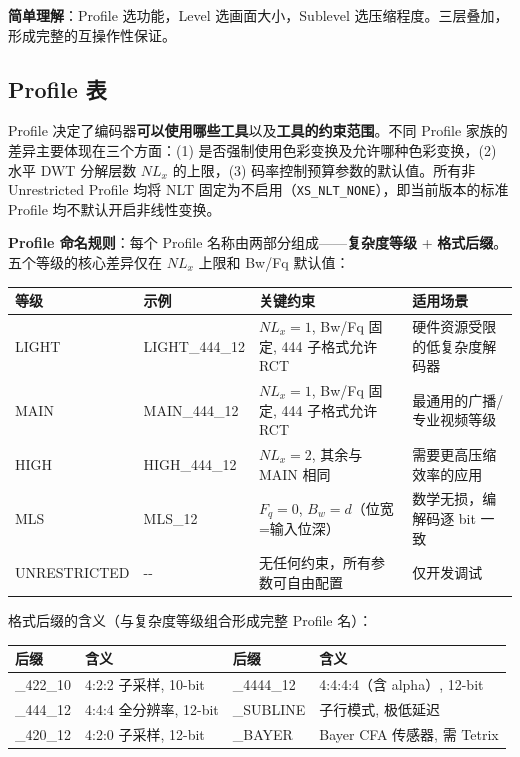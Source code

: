 \textbf{简单理解}：Profile 选功能，Level 选画面大小，Sublevel 选压缩程度。三层叠加，形成完整的互操作性保证。

\subsection{Profile 表}

Profile 决定了编码器\textbf{可以使用哪些工具}以及\textbf{工具的约束范围}。不同 Profile 家族的差异主要体现在三个方面：(1) 是否强制使用色彩变换及允许哪种色彩变换，(2) 水平 DWT 分解层数 $NL_x$ 的上限，(3) 码率控制预算参数的默认值。所有非 Unrestricted Profile 均将 NLT 固定为不启用（\texttt{XS\_NLT\_NONE}），即当前版本的标准 Profile 均不默认开启非线性变换。

\medskip
\textbf{Profile 命名规则}：每个 Profile 名称由两部分组成——\textbf{复杂度等级} + \textbf{格式后缀}。五个等级的核心差异仅在 $NL_x$ 上限和 Bw/Fq 默认值：

\begin{center}
\small
\begin{tabular}{@{}L{1.4cm}L{2.4cm}L{3.5cm}L{4.0cm}@{}}
\toprule
等级 & 示例 & 关键约束 & 适用场景 \\
\midrule
LIGHT   & LIGHT\_444\_12 & $NL_x{=}1$, Bw/Fq 固定, 444 子格式允许 RCT & 硬件资源受限的低复杂度解码器 \\
MAIN    & MAIN\_444\_12  & $NL_x{=}1$, Bw/Fq 固定, 444 子格式允许 RCT & 最通用的广播/专业视频等级 \\
HIGH    & HIGH\_444\_12  & $NL_x{=}2$, 其余与 MAIN 相同 & 需要更高压缩效率的应用 \\
MLS     & MLS\_12       & $F_q{=}0$, $B_w{=}d$（位宽=输入位深） & 数学无损，编解码逐 bit 一致 \\
UNRESTRICTED & -{}-  & 无任何约束，所有参数可自由配置 & 仅开发调试 \\
\bottomrule
\end{tabular}
\end{center}

格式后缀的含义（与复杂度等级组合形成完整 Profile 名）：

\begin{center}
\small
\begin{tabular}{@{}L{1.8cm}L{3.5cm}L{1.8cm}L{3.5cm}@{}}
\toprule
后缀 & 含义 & 后缀 & 含义 \\
\midrule
\_422\_10  & 4:2:2 子采样, 10-bit  & \_4444\_12 & 4:4:4:4（含 alpha）, 12-bit \\
\_444\_12  & 4:4:4 全分辨率, 12-bit & \_SUBLINE  & 子行模式, 极低延迟 \\
\_420\_12  & 4:2:0 子采样, 12-bit  & \_BAYER    & Bayer CFA 传感器, 需 Tetrix \\
\bottomrule
\end{tabular}
\end{center}

